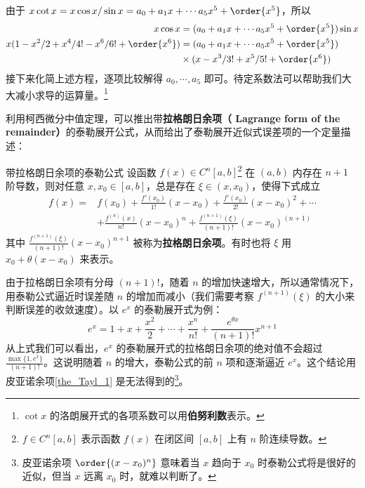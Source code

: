 由于 $x\cot x=x\cos x/\sin x=a_0+a_1 x+\cdots a_5 x^5+\order{x^5}$，所以
\begin{equation}
\begin{aligned}
x\cos x&=(a_0+a_1 x+\cdots a_5 x^5+\order{x^5})\sin x\\
x(1-x^2/2+x^4/4!-x^6/6!+\order{x^6})&=(a_0+a_1 x+\cdots a_5 x^5+\order{x^5})\\
&\times (x-x^3/3!+x^5/5!+\order{x^6})
\end{aligned}
\end{equation}
接下来化简上述方程，逐项比较解得 $a_0,\cdots,a_5$ 即可。待定系数法可以帮助我们大大减小求导的运算量。\footnote{$\cot x$ 的洛朗展开式的各项系数可以用\textbf{伯努利数}表示。}

利用柯西微分中值定理，可以推出带\textbf{拉格朗日余项（ Lagrange form of the remainder）}的泰勒展开公式，从而给出了泰勒展开近似式误差项的一个定量描述：
\begin{theorem}{带拉格朗日余项的泰勒公式}
设函数 $f(x)\in C^n[a,b]$\footnote{$f\in C^n[a,b]$ 表示函数 $f(x)$ 在闭区间 $[a,b]$ 上有 $n$ 阶连续导数。} 在 $(a,b)$ 内存在 $n+1$ 阶导数，则对任意 $x,x_0\in [a,b]$，总是存在 $\xi\in (x,x_0)$，使得下式成立
\begin{equation}\label{eq_Tayl_3}
\begin{aligned}
f(x)=&f(x_0)+\frac{f'(x_0)}{1!}(x-x_0)+\frac{f'(x_0)}{2!}(x-x_0)^2+\cdots\\
&+\frac{f^{(n)}(x)}{n!}(x-x_0)^n+\frac{f^{(n+1)}(\xi)}{(n+1)!}(x-x_0)^{(n+1)}
\end{aligned}
\end{equation}
其中 $\frac{f^{(n+1)}(\xi)}{(n+1)!}(x-x_0)^{n+1}$ 被称为\textbf{拉格朗日余项}。有时也将 $\xi$ 用 $x_0+\theta(x-x_0)$ 来表示。
\end{theorem}

由于拉格朗日余项有分母 $(n+1)!$，随着 $n$ 的增加快速增大，所以通常情况下，用泰勒公式逼近时误差随 $n$ 的增加而减小（我们需要考察 $f^{(n+1)}(\xi)$ 的大小来判断误差的收敛速度）。以 $e^x$ 的泰勒展开式为例：
\begin{equation}
e^x=1+x+\frac{x^2}{2}+\cdots+\frac{x^n}{n!}+\frac{e^{\theta x}}{(n+1)!}x^{n+1}
\end{equation}
从上式我们可以看出，$e^x$ 的泰勒展开式的拉格朗日余项的绝对值不会超过 $\frac{\max\{1,e^x\}}{(n+1)!}$。这说明随着 $n$ 的增大，泰勒公式的前 $n$ 项和逐渐逼近 $e^x$。这个结论用皮亚诺余项\autoref{the_Tayl_1} 是无法得到的\footnote{皮亚诺余项 $\order{(x-x_0)^n}$ 意味着当 $x$ 趋向于 $x_0$ 时泰勒公式将是很好的近似，但当 $x$ 远离 $x_0$ 时，就难以判断了。}。

